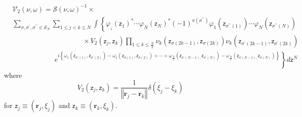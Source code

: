 \documentclass[aps,preprint]{revtex4}%
\begin{document}
\begin{align}
&  \mathcal{V}_{2}\left(  \nu,\omega\right)  =\mathcal{S}\left(  \nu
,\omega\right)  ^{-1}\times\nonumber\\
&
{\displaystyle\sum\limits_{\sigma,\sigma^{\prime},\sigma^{\prime\prime}%
\in\mathcal{S}_{N}}}
{\displaystyle\sum\limits_{1\leq j<k\leq N}}
\int\left\{  \varphi_{_{1}}\left(  \mathsf{z}_{1}\right)  ^{\ast}\cdots
\varphi_{N}\left(  \mathsf{z}_{N}\right)  ^{\ast}\left(  -1\right)
^{\pi\left(  \sigma^{\prime\prime}\right)  }\varphi_{1}\left(  \mathsf{z}%
_{\sigma^{\prime\prime}\left(  1\right)  }\right)  \cdots\varphi_{N}\left(
\mathsf{z}_{\sigma^{\prime\prime}\left(  N\right)  }\right)  \right.
\nonumber\\
&  \qquad\qquad\qquad\qquad\qquad\times V_{2}\left(  \mathsf{z}_{j}%
,\mathsf{z}_{k}\right)
{\displaystyle\prod\limits_{1\leq k\leq\frac{N}{2}}}
\nu_{k}\left(  \mathsf{z}_{\sigma\left(  2k-1\right)  },\mathsf{z}%
_{\sigma\left(  2k\right)  }\right)  \nu_{k}\left(  \mathsf{z}_{\sigma
^{\prime}\left(  2k-1\right)  },\mathsf{z}_{\sigma^{\prime}\left(  2k\right)
}\right) \nonumber\\
&  \qquad\qquad\qquad\left.  e^{i\left\{  \omega_{1}\left(  \mathsf{z}%
_{\sigma^{\prime}\left(  1\right)  },\mathsf{z}_{\sigma^{\prime}\left(
2\right)  }\right)  -\omega_{1}\left(  \mathsf{z}_{\sigma\left(  1\right)
},\mathsf{z}_{\sigma\left(  2\right)  }\right)  +\cdots+\omega_{\frac{N}{2}%
}\left(  \mathsf{z}_{\sigma^{\prime}\left(  N-1\right)  ,}\mathsf{z}%
_{\sigma^{\prime}\left(  N\right)  }\right)  -\omega_{\frac{N}{2}}\left(
\mathsf{z}_{\sigma\left(  N-1\right)  ,}\mathsf{z}_{\sigma\left(  N\right)
}\right)  \right\}  }\right\}  d\mathsf{z}^{N}%
\end{align}
where%
\begin{equation}
V_{2}\left(  \mathsf{z}_{j},\mathsf{z}_{k}\right)  =\frac{1}{\left\Vert
\mathbf{r}_{j}-\mathbf{r}_{k}\right\Vert }\delta\left(  \xi_{j}-\xi
_{k}\right)
\end{equation}
for $\mathsf{z}_{j}\equiv\left(  \mathbf{r}_{j},\xi_{j}\right)  $ and
$\mathsf{z}_{k}\equiv\left(  \mathbf{r}_{k},\xi_{k}\right)  .$
\end{document}
